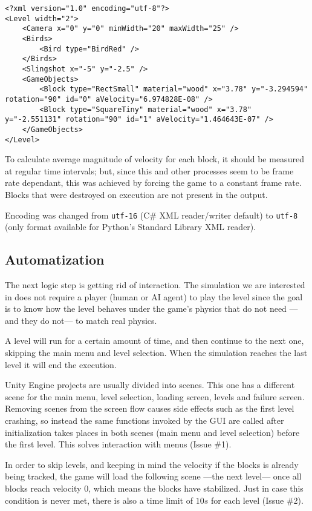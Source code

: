 \lstset{language=XML}
\begin{lstlisting}[caption=Sample level output to show format, label=xmlsampleOUT]
<?xml version="1.0" encoding="utf-8"?>
<Level width="2">
	<Camera x="0" y="0" minWidth="20" maxWidth="25" />
	<Birds>
		<Bird type="BirdRed" />
	</Birds>
	<Slingshot x="-5" y="-2.5" />
	<GameObjects>
		<Block type="RectSmall" material="wood" x="3.78" y="-3.294594" rotation="90" id="0" aVelocity="6.974828E-08" />
		<Block type="SquareTiny" material="wood" x="3.78" y="-2.551131" rotation="90" id="1" aVelocity="1.464643E-07" />
	</GameObjects>
</Level>
\end{lstlisting}

To calculate average magnitude of velocity for each block, it should be measured at regular time intervals; but, since this and other processes seem to be frame rate dependant, this was achieved by forcing the game to a constant frame rate. Blocks that were destroyed on execution are not present in the output.

Encoding was changed from \texttt{utf-16} (C\# XML reader/writer default) to \texttt{utf-8} (only format available for Python's Standard Library XML reader).

\subsection{Automatization}

The next logic step is getting rid of interaction. The simulation we are interested in does not require a player (human or AI agent) to play the level since the goal is to know how the level behaves under the game's physics that do not need ---and they do not--- to match real physics. 

A level will run for a certain amount of time, and then continue to the next one, skipping the main menu and level selection. When the simulation reaches the last level it will end the execution.

Unity Engine projects are usually divided into scenes. This one has a different scene for the main menu, level selection, loading screen, levels and failure screen. Removing scenes from the screen flow causes side effects such as the first level crashing, so instead the same functions invoked by the \acs{GUI} are called after initialization takes places in both scenes (main menu and level selection) before the first level. This solves interaction with menus (Issue \#1). 

In order to skip levels, and keeping in mind the velocity if the blocks is already being tracked, the game will load the following scene ---the next level--- once all blocks reach velocity $0$, which means the blocks have stabilized. Just in case this condition is never met, there is also a time limit of $10s$ for each level (Issue \#2). 

